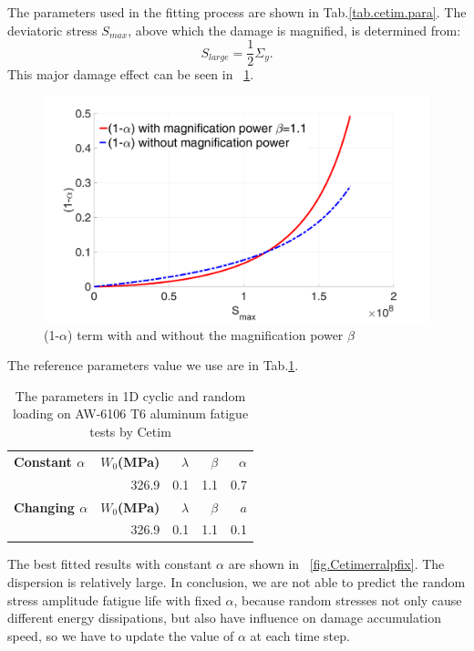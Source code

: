 \documentclass[3p,times,number,review]{elsarticle}
\newcommand{\figref}[1]{\figurename~\ref{#1}}
\begin{document}
The parameters used in the fitting process are shown in Tab.\ref{tab.cetim.para}. 
The deviatoric stress $S_{max}$, above which the damage is magnified,  is determined from:
$$S_{large}=\dfrac{1}{2}\Sigma_y.$$ 
This major damage effect can be seen in \figref{fig.SmaxSequence}.

\begin{figure}[!h]
	\centering
	\includegraphics[width=\textwidth]{figures//alp_Smax_fb.png} 
	\caption{(1-$\alpha$) term with and without the magnification power $\beta$}
	\label{fig.SmaxSequence}
\end{figure}

The reference parameters value we use are in Tab.\ref{tab.cetim.alp}.  
\begin{table}[!h]
	\centering
	\begin{tabular}{lrrrr}
		\hline
\textbf{Constant $\alpha$} & \textbf{$W_0$(MPa)} & \textbf{$\lambda$} & \textbf{$\beta$}  & \textbf{$\alpha$}\\
		      & 326.9         & 0.1               & 1.1            & 0.7                         \\ \hline
\textbf{Changing $\alpha$} & \textbf{$W_0$(MPa)} & \textbf{$\lambda$} & \textbf{$\beta$}  & \textbf{$a$}\\
		      & 326.9         & 0.1               & 1.1            & 0.1                         \\ \hline
	\end{tabular}
	\caption{The parameters in 1D cyclic and random loading on AW-6106 T6
		aluminum fatigue tests by Cetim}
	\label{tab.cetim.alp}
\end{table}

The best fitted results with constant $\alpha$ are shown in \figref{fig.Cetimerralpfix}. The dispersion is relatively large. In conclusion, we are not able to predict the random stress amplitude fatigue life with fixed $\alpha$, because random stresses not only cause different energy dissipations, but also have influence on damage accumulation speed, so we have to update the value of $\alpha$ at each time step. 
\end{document}
